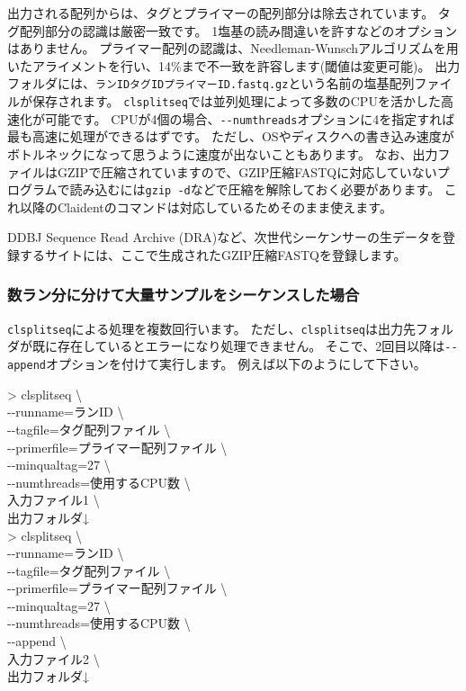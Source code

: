 \documentclass[titlepage,10pt,a4paper]{jsbook}
\newenvironment{cmd}{\begin{oframed}\raggedright\ttfamily\footnotesize\setlength{\baselineskip}{1.4em}}{\end{oframed}\vspace{-1em}}
\begin{document}
出力される配列からは、タグとプライマーの配列部分は除去されています。
タグ配列部分の認識は厳密一致です。
1塩基の読み間違いを許すなどのオプションはありません。
プライマー配列の認識は、Needleman-Wunschアルゴリズムを用いたアライメントを行い、14\%まで不一致を許容します(閾値は変更可能)。
出力フォルダには、\texttt{ランID{\textunderscore}{\textunderscore}タグID{\textunderscore}{\textunderscore}プライマーID.fastq.gz}という名前の塩基配列ファイルが保存されます。
\texttt{clsplitseq}では並列処理によって多数のCPUを活かした高速化が可能です。
CPUが4個の場合、\texttt{{-}{-}numthreads}オプションに4を指定すれば最も高速に処理ができるはずです。
ただし、OSやディスクへの書き込み速度がボトルネックになって思うように速度が出ないこともあります。
なお、出力ファイルはGZIPで圧縮されていますので、GZIP圧縮FASTQに対応していないプログラムで読み込むには\texttt{gzip -d}などで圧縮を解除しておく必要があります。
これ以降のClaidentのコマンドは対応しているためそのまま使えます。

DDBJ Sequence Read Archive (DRA)など、次世代シーケンサーの生データを登録するサイトには、ここで生成されたGZIP圧縮FASTQを登録します。

\subsubsection{数ラン分に分けて大量サンプルをシーケンスした場合}
\texttt{clsplitseq}による処理を複数回行います。
ただし、\texttt{clsplitseq}は出力先フォルダが既に存在しているとエラーになり処理できません。
そこで、2回目以降は\texttt{{-}{-}append}オプションを付けて実行します。
例えば以下のようにして下さい。

\begin{cmd}
{\textgreater} clsplitseq {\textbackslash}\\
{-}{-}runname=ランID {\textbackslash}\\
{-}{-}tagfile=タグ配列ファイル {\textbackslash}\\
{-}{-}primerfile=プライマー配列ファイル {\textbackslash}\\
{-}{-}minqualtag=27 {\textbackslash}\\
{-}{-}numthreads=使用するCPU数 {\textbackslash}\\
入力ファイル1 {\textbackslash}\\
出力フォルダ↓\\
{\textgreater} clsplitseq {\textbackslash}\\
{-}{-}runname=ランID {\textbackslash}\\
{-}{-}tagfile=タグ配列ファイル {\textbackslash}\\
{-}{-}primerfile=プライマー配列ファイル {\textbackslash}\\
{-}{-}minqualtag=27 {\textbackslash}\\
{-}{-}numthreads=使用するCPU数 {\textbackslash}\\
{-}{-}append {\textbackslash}\\
入力ファイル2 {\textbackslash}\\
出力フォルダ↓
\end{cmd}
\end{document}
